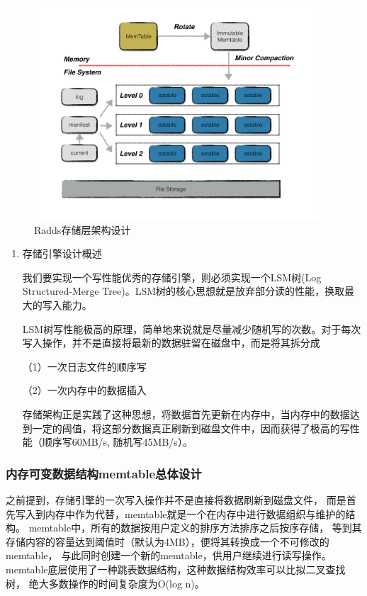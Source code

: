	\begin{figure}[H]
		\centering
		\includegraphics[width=0.95\textwidth]{images/radds_storage_arch}
		\caption{Radds存储层架构设计}
		\label{mobile_overall_design}
	\end{figure}


	\begin{enumerate}[fullwidth,itemindent=2em,listparindent=2em]
	
		\item 存储引擎设计概述
		
		我们要实现一个写性能优秀的存储引擎，则必须实现一个LSM树(Log Structured-Merge Tree)。LSM树的核心思想就是放弃部分读的性能，换取最大的写入能力。

		LSM树写性能极高的原理，简单地来说就是尽量减少随机写的次数。对于每次写入操作，并不是直接将最新的数据驻留在磁盘中，而是将其拆分成
		
		（1）{一次日志文件的顺序写}

		（2）{一次内存中的数据插入}

		存储架构正是实践了这种思想，将数据首先更新在内存中，当内存中的数据达到一定的阈值，将这部分数据真正刷新到磁盘文件中，因而获得了极高的写性能（顺序写60MB/s, 随机写45MB/s）。

	\end{enumerate}
		\subsubsection{内存可变数据结构memtable总体设计}
		
		之前提到，存储引擎的一次写入操作并不是直接将数据刷新到磁盘文件，
		而是首先写入到内存中作为代替，memtable就是一个在内存中进行数据组织与维护的结构。
		memtable中，所有的数据按用户定义的排序方法排序之后按序存储，
		等到其存储内容的容量达到阈值时（默认为4MB），便将其转换成一个不可修改的memtable，
		与此同时创建一个新的memtable，供用户继续进行读写操作。
		memtable底层使用了一种跳表数据结构，这种数据结构效率可以比拟二叉查找树，
		绝大多数操作的时间复杂度为O(log n)。

